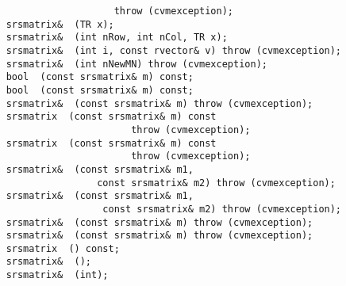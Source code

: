 \verb"                       throw (cvmexception);"\\
\verb"    srsmatrix& "\verb" (TR x);"\\
\verb"    srsmatrix& "\verb" (int nRow, int nCol, TR x);"\\
\verb"    srsmatrix& "\verb" (int i, const rvector& v) throw (cvmexception);"\\
\verb"    srsmatrix& "\verb" (int nNewMN) throw (cvmexception);"\\
\verb"    bool "\verb" (const srsmatrix& m) const;"\\
\verb"    bool "\verb" (const srsmatrix& m) const;"\\
\verb"    srsmatrix& "\verb" (const srsmatrix& m) throw (cvmexception);"\\
\verb"    srsmatrix "\verb" (const srsmatrix& m) const"\\
\verb"                          throw (cvmexception);"\\
\verb"    srsmatrix "\verb" (const srsmatrix& m) const"\\
\verb"                          throw (cvmexception);"\\
\verb"    srsmatrix& "\verb" (const srsmatrix& m1,"\\
\verb"                    const srsmatrix& m2) throw (cvmexception);"\\
\verb"    srsmatrix& "\verb" (const srsmatrix& m1,"\\
\verb"                     const srsmatrix& m2) throw (cvmexception);"\\
\verb"    srsmatrix& "\verb" (const srsmatrix& m) throw (cvmexception);"\\
\verb"    srsmatrix& "\verb" (const srsmatrix& m) throw (cvmexception);"\\
\verb"    srsmatrix "\verb" () const;"\\
\verb"    srsmatrix& "\verb" ();"\\
\verb"    srsmatrix& "\verb" (int);"\\
